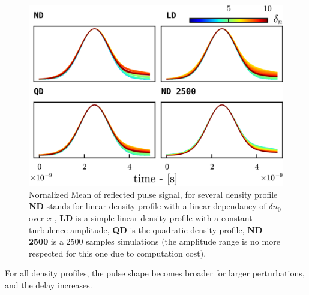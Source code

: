 \documentclass[11pt,a4paper,openany]{report}
\begin{document}
\begin{multicols}{2}
    \begin{figure}[H]
        \centering
        \includegraphics[width=1\linewidth]{./figures/pulse_shape.png}
        \caption{Nornalized Mean of reflected pulse signal, for several density profile \textbf{ND} stands for linear density profile with a linear dependancy of $\delta n_0$ over $x$  , \textbf{LD} is a simple linear density profile with a constant turbulence amplitude, \textbf{QD} is the quadratic density profile, \textbf{ND 2500} is a 2500 samples simulations (the amplitude range is no more respected for this one due to computation cost). }

        \label{fig:barrier}
    \end{figure}
    For all density profiles, the pulse shape becomes broader for larger perturbations, and the delay increases.


\end{multicols}
\end{document}
